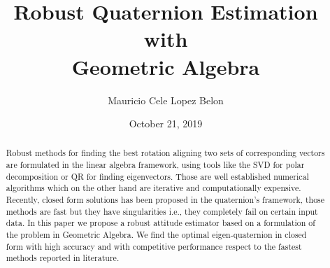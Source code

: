 \documentclass{birkjour}
\numberwithin{equation}{section}
\begin{document}
%
%
%
%
%
%
%
%
%


\title[Robust Quaternion Estimation with Geometric Algebra]
 {Robust Quaternion Estimation with \\Geometric Algebra}

\author[Mauricio Cele Lopez Belon]{Mauricio Cele Lopez Belon}
\address{Madrid, Spain}



\date{October 21, 2019}

\begin{abstract}

Robust methods for finding the best rotation aligning two sets of corresponding vectors are formulated in the linear algebra framework, using tools like the SVD for polar decomposition or QR for finding eigenvectors. Those are well established numerical algorithms which on the other hand are iterative and computationally expensive. Recently, closed form solutions has been proposed in the quaternion's framework, those methods are fast but they have singularities i.e., they completely fail on certain input data. In this paper we propose a robust attitude estimator based on a formulation of the problem in Geometric Algebra. We find the optimal eigen-quaternion in closed form with high accuracy and with competitive performance respect to the fastest methods reported in literature.

\end{abstract}

\maketitle
\end{document}
